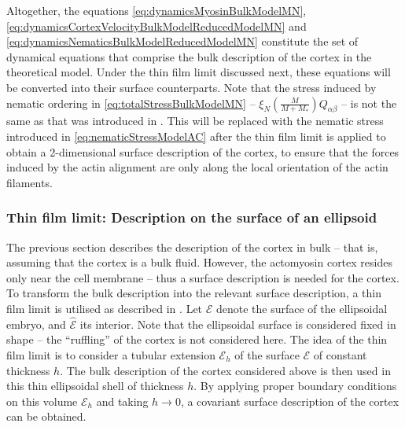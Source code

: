 Altogether, the equations \autoref{eq:dynamicsMyosinBulkModelMN}, \autoref{eq:dynamicsCortexVelocityBulkModelReducedModelMN} and \autoref{eq:dynamicsNematicsBulkModelReducedModelMN} constitute the set of dynamical equations that comprise the bulk description of the cortex in the theoretical model. Under the thin film limit discussed next, these equations will be converted into their surface counterparts. Note that the stress induced by nematic ordering in \autoref{eq:totalStressBulkModelMN} -- $\xi_N \left(\frac{M}{M + M_*}\right) Q_{\alpha\beta}$ -- is not the same as that was introduced in \cite{reymann2016cortical}. This will be replaced with the nematic stress introduced in \autoref{eq:nematicStressModelAC} after the thin film limit is applied to obtain a 2-dimensional surface description of the cortex, to ensure that the forces induced by the actin alignment are only along the local orientation of the actin filaments.

\subsubsection{Thin film limit: Description on the surface of an ellipsoid}
The previous section describes the description of the cortex in bulk -- that is, assuming that the cortex is a bulk fluid. However, the actomyosin cortex resides only near the cell membrane -- thus a surface description is needed for the cortex. To transform the bulk description into the relevant surface description, a thin film limit is utilised as described in \citep{nitschke2018nematic}. Let $\mathcal{E}$ denote the surface of the ellipsoidal embryo, and $\hat{\mathcal{E}}$ its interior. Note that the ellipsoidal surface is considered fixed in shape -- the \enquote{ruffling} of the cortex is not considered here. The idea of the thin film limit is to consider a tubular extension $\mathcal{E}_h$ of the surface $\mathcal{E}$ of constant thickness $h$. The bulk description of the cortex considered above is then used in this thin ellipsoidal shell of thickness $h$. By applying proper boundary conditions on this volume $\mathcal{E}_h$ and taking $h \rightarrow 0$, a covariant surface description of the cortex can be obtained.

